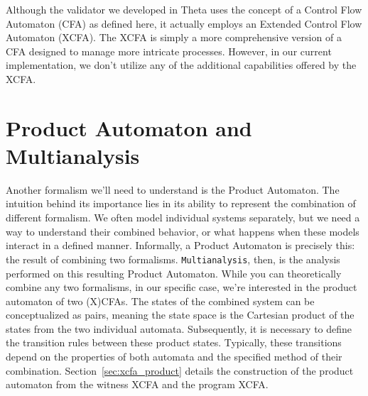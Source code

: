 Although the validator we developed in Theta uses the concept of a Control Flow Automaton (CFA) as 
defined here, it actually employs an Extended Control Flow Automaton (XCFA). The XCFA is simply 
a more comprehensive version of a CFA designed to manage more intricate processes. However, in 
our current implementation, we don't utilize any of the additional capabilities offered by the XCFA.



\section{Product Automaton and Multianalysis}
Another formalism we'll need to understand is the Product Automaton. The intuition behind its 
importance lies in its ability to represent the combination of different formalism. We 
often model individual systems separately, but we need a way to understand their combined behavior, 
or what happens when these models interact in a defined manner. Informally, a Product 
Automaton is precisely this: the result of combining two formalisms. \texttt{Multianalysis}, then,
is the analysis performed on this resulting Product Automaton. While you can theoretically 
combine any two formalisms, in our specific case, we're interested in the product automaton 
of two (X)CFAs. The states of the combined system can be conceptualized as pairs, meaning the
state space is the Cartesian product of the states from the two individual automata.
Subsequently, it is necessary to define the transition rules between these product states.
Typically, these transitions depend on the properties of both automata and the
specified method of their combination. 
Section~\ref{sec:xcfa_product} details the construction of the product
automaton from the witness XCFA and the program XCFA. 


